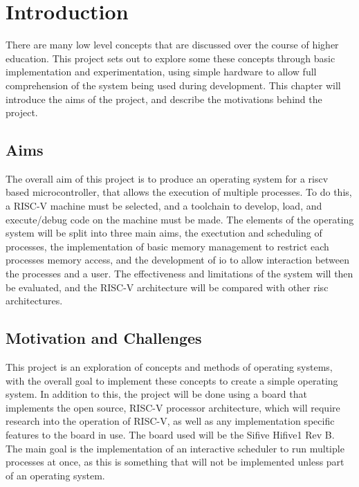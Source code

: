\chapter{Introduction}
\label{cha:intro}
There are many low level concepts that are discussed over the course of higher education. This project sets out to explore some these concepts through basic implementation and experimentation, using simple hardware to allow full comprehension of the system being used during development. This chapter will introduce the aims of the project, and describe the motivations behind the project.
\section{Aims}
The overall aim of this project is to produce an operating system for a \gls{riscv} based microcontroller, that allows the execution of multiple processes. To do this, a RISC-V machine must be selected, and a toolchain to develop, load, and execute/debug code on the machine must be made. The elements of the operating system will be split into three main aims, the exectution and scheduling of processes, the implementation of basic memory management to restrict each processes memory access, and the development of \ac{io} to allow interaction between the processes and a user. The effectiveness and limitations of the system will then be evaluated, and the RISC-V architecture will be compared with other \ac{risc} architectures.

\section{Motivation and Challenges}
This project is an exploration of concepts and methods of operating systems, with the overall goal to implement these concepts to create a simple operating system. 
In addition to this, the project will be done using a board that implements the open source, RISC-V processor architecture, which will require research into the operation of RISC-V, as well as any implementation specific features to the board in use. The board used will be the Sifive Hifive1 Rev B.
The main goal is the implementation of an interactive scheduler to run multiple processes at once, as this is something that will not be implemented unless part of an operating system.

